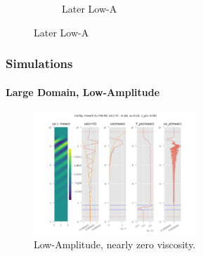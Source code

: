 \documentclass[dvipsnames, 10pt]{beamer}
\begin{document}
\begin{frame}
\begin{figure}[t]
\begin{subfigure}{0.55\textwidth}
            \caption{Later Low-A}
        \end{subfigure}
        \hspace*{-19mm}%
    \end{figure}
\end{frame}

\begin{frame}
    \frametitle{Simulations}
    \framesubtitle{Large Domain, Low-Amplitude}

    \begin{figure}[t]
        \centering
        \includegraphics[width=0.55\textwidth]{lin_nonu.png}
        \caption{Low-Amplitude, nearly zero viscosity.}
    \end{figure}
\end{frame}
\end{document}
